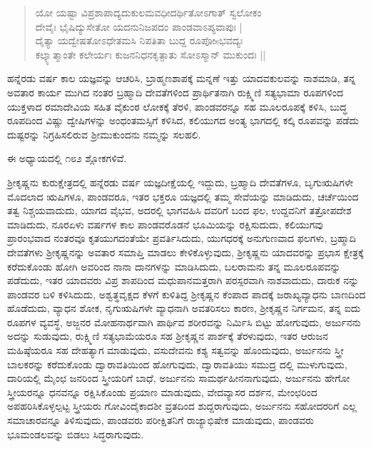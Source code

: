 \begin{verse}
ಯೋ ಯಷ್ಟಾ ವಿಪ್ರಶಾಪಾದ್ಯದುಕುಲಮವಧೀದರ್ಥಿತೋಽಗಾತ್ ಸ್ವಲೋಕಂ\\ ದೇವೈಃ ಭೈಷಿದ್ಯುಸೇತೋ ಯದನುನಿಜಪದಂ ಪಾಂಡವಾಽಪ್ಯವಾಪುಃ |\\ ದೈತ್ಯಾ ಯದ್ವೇಷತೋಽಧೇತಮಸಿ ನಿಪತಿತಾ ಬುದ್ದ ರೂಪೋsಭವದ್ಯಃ\\ ಕಲ್ಕ್ಯಾತ್ಮಾಂತೇ ಕಲೇರ್ಯಃ ಕುಜನನಿಧನಕೃತ್ಪಾತು ಸೋಽಸ್ಮಾನ್ ಮುಕುಂದಃ ||
\end{verse}

ಹನ್ನೆರಡು ವರ್ಷ ಕಾಲ ಯಜ್ಞವನ್ನು ಆಚರಿಸಿ, ಬ್ರಾಹ್ಮಣಶಾಪಕ್ಕೆ ಮನ್ನಣೆ ಇತ್ತು ಯಾದವಕುಲವನ್ನು ನಾಶಮಾಡಿ, ತನ್ನ ಅವತಾರ ಕಾರ್ಯ ಮುಗಿದ ನಂತರ ಬ್ರಹ್ಮಾದಿ ದೇವತೆಗಳಿಂದ ಪ್ರಾರ್ಥಿತನಾಗಿ ರುಕ್ಷ್ಮಿಣಿ ಸತ್ಯಭಾಮಾ ರೂಪಗಳಿಂದ ಯುಕ್ತಳಾದ ರಮಾದೇವಿಯ ಸಹಿತ ವೈಕುಂಠ ಲೋಕಕ್ಕೆ ತೆರಳಿ, ಪಾಂಡವರನ್ನೂ ಸಹ ಮೂಲರೂಪಕ್ಕೆ ಕಳಿಸಿ, ಬುದ್ಧ ರೂಪದಿಂದ ವಿಷ್ಣು ದ್ವೇಷಿಗಳನ್ನು ಅಂಧಂತಮಸ್ಸಿಗೆ ಕಳಿಸಿದ, ಕಲಿಯುಗದ ಅಂತ್ಯ ಭಾಗದಲ್ಲಿ ಕಲ್ಕಿ ರೂಪವನ್ನು ಪಡೆದು ದುಷ್ಟರನ್ನು ನಿಗ್ರಹಿಸಲಿರುವ ಶ‍್ರೀಮುಕುಂದನು ನಮ್ಮನ್ನು ಸಲಹಲಿ.

ಈ ಅಧ್ಯಾಯದಲ್ಲಿ ೧೮೨ ಶ್ಲೋಕಗಳಿವೆ.

ಶ‍್ರೀಕೃಷ್ಣನು ಕುರುಕ್ಷೇತ್ರದಲ್ಲಿ ಹನ್ನೆರಡು ವರ್ಷ ಯಜ್ಞದೀಕ್ಷೆಯಲ್ಲಿ ಇದ್ದುದು, ಬ್ರಹ್ಮಾದಿ ದೇವತೆಗಳೂ, ಬೃಗುಋಷಿಗಳೇ ಮೊದಲಾದ ಋಷಿಗಳೂ, ಪಾಂಡವರೂ, ಇತರ ಭಕ್ತರೂ ಯಜ್ಞದಲ್ಲಿ ತಮ್ಮ ಸೇವೆಯನ್ನು ಮಾಡಿದುದು, ಚರ್ಚೆಯಿಂದ ತತ್ವ ನಿಶ್ಚಯವಾದುದು, ಯಾಗದ ವೈಭವ, ಅದರಲ್ಲಿ ಭಾಗವಹಿಸಿ ದವರಿಗೆ ಬಂದ ಫಲ, ಉದ್ದವನಿಗೆ ತತ್ರೋಪದೇಶ ಮಾಡಿದುದು, ನೂರಏಳು ವರ್ಷಗಳ ಕಾಲ ಪಾಂಡವರೊಡನೆ ಭೂಮಿಯನ್ನು ರಕ್ಷಿಸುದುದು, ಕಲಿಯುಗವು ಪ್ರಾರಂಭವಾದ ನಂತರವೂ ಕೃತಯುಗದಂತೆಯೇ ಪ್ರವರ್ತಿಸಿದುದು, ಯುಗಧರಕ್ಕೆ ಅನುಗುಣವಾದ ಫಲಗಳು, ಬ್ರಹ್ಮಾದಿ ದೇವತೆಗಳು ಶ‍್ರೀಕೃಷ್ಣನನ್ನು ಅವತಾರ ಸಮಾಪ್ತಿ ಮಾಡಲು ಕೇಳಿಕೊಳ್ಳುವುದು, ಶ‍್ರೀಕೃಷ್ಣನು ಯಾದವರನ್ನು ಪ್ರಭಾಸ ಕ್ಷೇತ್ರಕ್ಕೆ ಕರೆದುಕೊಂಡು ಹೋಗಿ ಅವರಿಂದ ನಾನಾ ದಾನಗಳನ್ನು ಮಾಡಿಸಿದುದು, ಬಲರಾಮನು ತನ್ನ ಮೂಲರೂಪವನ್ನು ಪಡೆದುದು, ಇತರ ಯಾದವರು ವಿಪ್ರ ಶಾಪದಿಂದ ಮಧುಪಾನಮತ್ತರಾಗಿ ಪರಸ್ಪರವಾಗಿ ನಾಶವಾದುದು, ದಾರುಕ ನನ್ನು ಪಾಂಡವರ ಬಳಿ ಕಳಿಸಿದುದು, ಅಶ್ವತ್ಥವೃಕ್ಷದ ಕೆಳಗೆ ಕುಳಿತಿದ್ದ ಶ‍್ರೀಕೃಷ್ಣನ ಕೆಂಪಾದ ಪಾದಕ್ಕೆ ಜರಾಖ್ಯವ್ಯಾಧನು ಬಾಣದಿಂದ ಹೊಡೆದುದು, ವ್ಯಾಧನ ಶೋಕ, ನೃಗುಋಷಿಗಳೇ ವ್ಯಾಧನಾಗಿ ಅವತರಿಸಲು ಕಾರಣ, ಶ‍್ರೀಕೃಷ್ಣನ ನಿರ್ಗಮನ, ತನ್ನ ಐದು ರೂಪಗಳ ವ್ಯವಸ್ಥೆ, ಅಜ್ಜನರ ಮೋಹನಾರ್ಥವಾಗಿ ಪಾರ್ಥಿವ ಶರೀರವನ್ನು ನಿರ್ಮಿಸಿ ಬಿಟ್ಟು ಹೋಗುವುದು, ಅರ್ಜುನನು ಅದನ್ನು ಸುಡುವುದು, ರುಕ್ಷ್ಮಿಣಿ ಸತ್ಯಭಾಮೆಯರೂ ಸಹ ಶ‍್ರೀಕೃಷ್ಣನ ಪಾರ್ಶಕ್ಕೆ ತೆರಳುವುದು, ಇತರ ಆರುಜನ ಮಹಿಷ್ಠೆಯರೂ ಸಹ ದೇಹತ್ಯಾಗ ಮಾಡುವುದು, ವಸುದೇವನು ಕಶ್ಯ ಸತ್ವವನ್ನು ಹೊಂದುವುದು, ಅರ್ಜುನನು ಸ್ತ್ರೀ ಬಾಲಕರನ್ನು ಕರೆದುಕೊಂಡು ದ್ವಾರಾವತಿಯಿಂದ ಹೋಗುವುದು, ದ್ವಾರಾವತಿಯು ಸಮುದ್ರ ದಲ್ಲಿ ಮುಳುಗುವುದು, ದಾರಿಯಲ್ಲಿ ಮೈಂಛ ಜನರಿಂದ ಸ್ತ್ರೀಯರಿಗೆ ಬಾಧೆ, ಅರ್ಜುನನು ಸಾಮರ್ಥಹೀನನಾಗುವುದು, ಅರ್ಜುನನು ಹೇಗೋ ಸ್ತ್ರೀಯರನ್ನೂ ಧನವನ್ನೂ ರಕ್ಷಿಸಿಕೊಂಡು ಪ್ರಯಾಣ ಮಾಡುವುದು, ವೇದವ್ಯಾಸರ ದರ್ಶನ, ಮೇಂಛರಿಂದ ಅಪಹರಿಸಿಕೊಳ್ಳಲ್ಪಟ್ಟ ಸ್ತ್ರೀಯರು ಗೋವಿಂದೈಕಾದಶೀ ವ್ರತದಿಂದ ಶುದ್ದರಾಗುವುದು, ಅರ್ಜುನನು ಸಹೋದರರಿಗೆ ಎಲ್ಲ ಸಮಾಚಾರವನ್ನೂ ತಿಳಿಸುವುದು, ಪಾಂಡವರು ಪರೀಕ್ಷಿತನಿಗೆ ರಾಜ್ಯಾಭಿಷೇಕ ಮಾಡುವುದು, ಪಾಂಡವರು ಭೂಮಂಡಲವನ್ನು ಬಿಡಲು ಸಿದ್ಧರಾಗುವುದು.

